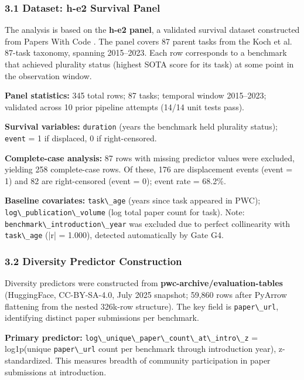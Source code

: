 
\subsubsection{3.1 Dataset: h-e2 Survival Panel}

The analysis is based on the \textbf{h-e2 panel}, a validated survival dataset constructed from Papers With Code \cite{paperwithcode2025}. The panel covers 87 parent tasks from the Koch et al. \cite{koch2021reduced} 87-task taxonomy, spanning 2015--2023. Each row corresponds to a benchmark that achieved plurality status (highest SOTA score for its task) at some point in the observation window.

\textbf{Panel statistics:} 345 total rows; 87 tasks; temporal window 2015--2023; validated across 10 prior pipeline attempts (14/14 unit tests pass).

\textbf{Survival variables:} \texttt{duration} (years the benchmark held plurality status); \texttt{event} = 1 if displaced, 0 if right-censored.

\textbf{Complete-case analysis:} 87 rows with missing predictor values were excluded, yielding 258 complete-case rows. Of these, 176 are displacement events (event = 1) and 82 are right-censored (event = 0); event rate = 68.2\%.

\textbf{Baseline covariates:} \texttt{task\textbackslash \_age} (years since task appeared in PWC); \texttt{log\textbackslash \_publication\textbackslash \_volume} (log total paper count for task). Note: \texttt{benchmark\textbackslash \_introduction\textbackslash \_year} was excluded due to perfect collinearity with \texttt{task\textbackslash \_age} (|r| = 1.000), detected automatically by Gate G4.

\subsubsection{3.2 Diversity Predictor Construction}

Diversity predictors were constructed from \textbf{pwc-archive/evaluation-tables} \cite{paperwithcode2025} (HuggingFace, CC-BY-SA-4.0, July 2025 snapshot; 59,860 rows after PyArrow flattening from the nested 326k-row structure). The key field is \texttt{paper\textbackslash \_url}, identifying distinct paper submissions per benchmark.

\textbf{Primary predictor:} \texttt{log\textbackslash \_unique\textbackslash \_paper\textbackslash \_count\textbackslash \_at\textbackslash \_intro\textbackslash \_z} = log1p(unique \texttt{paper\textbackslash \_url} count per benchmark through introduction year), z-standardized. This measures breadth of community participation in paper submissions at introduction.

